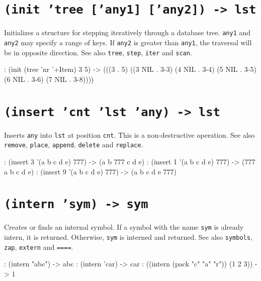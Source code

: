  
\section*{\texttt{(init 'tree ['any1] ['any2]) -> lst}}
\label{sec:func-ref-I-(init 'tree ['any1] ['any2]) -> lst}


Initializes a structure for stepping iteratively through a database
tree. \texttt{any1} and \texttt{any2} may specify a range of keys. If \texttt{any2} is
greater than \texttt{any1}, the traversal will be in opposite direction. See
also \texttt{tree}, \texttt{step}, \texttt{iter} and \texttt{scan}.


\begin{wideverbatim}
: (init (tree 'nr '+Item) 3 5)
-> (((3 . 5) ((3 NIL . {3-3}) (4 NIL . {3-4}) (5 NIL . {3-5}) (6 NIL . {3-6}) (7 NIL . {3-8}))))
\end{wideverbatim}

 
\section*{\texttt{(insert 'cnt 'lst 'any) -> lst}}
\label{sec:func-ref-I-(insert 'cnt 'lst 'any) -> lst}


Inserts \texttt{any} into \texttt{lst} at position \texttt{cnt}. This is a non-destructive
operation. See also \texttt{remove}, \texttt{place}, \texttt{append}, \texttt{delete} and \texttt{replace}.


\begin{wideverbatim}
: (insert 3 '(a b c d e) 777)
-> (a b 777 c d e)
: (insert 1 '(a b c d e) 777)
-> (777 a b c d e)
: (insert 9 '(a b c d e) 777)
-> (a b c d e 777)
\end{wideverbatim}

 
\section*{\texttt{(intern 'sym) -> sym}}
\label{sec:func-ref-I-(intern 'sym) -> sym}


Creates or finds an internal symbol. If a symbol with the name \texttt{sym} is
already intern, it is returned. Otherwise, \texttt{sym} is interned and
returned. See also \texttt{symbols}, \texttt{zap}, \texttt{extern} and \texttt{====}.


\begin{wideverbatim}
: (intern "abc")
-> abc
: (intern 'car)
-> car
: ((intern (pack "c" "a" "r")) (1 2 3))
-> 1
\end{wideverbatim}

